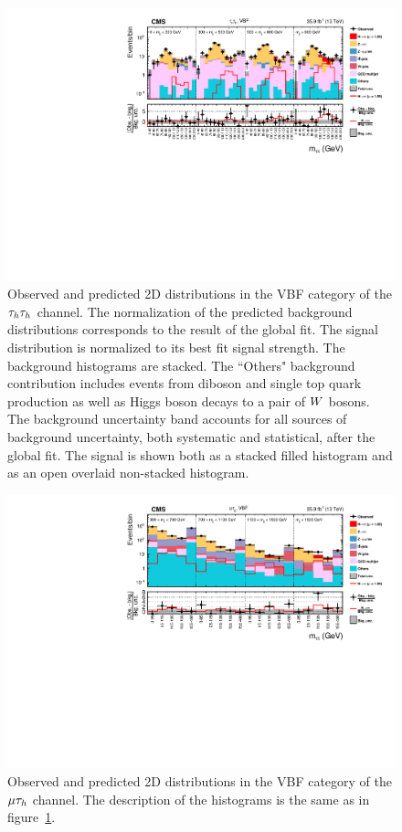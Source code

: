 \begin{figure}[htbp]
\centering
     \includegraphics[width=1.0\textwidth]{higgs_to_taus/plots/Figure_006.pdf}
     \caption{
Observed and predicted 2D distributions in the VBF category of the $\tau_{h}\tau_{h}$ channel.
The normalization of the predicted background distributions corresponds to the result of the global fit.
The signal distribution is normalized to its best fit signal strength. The background histograms are stacked. 
The ``Others" background contribution includes events from diboson and single top quark production as well 
as Higgs boson decays to a pair of $W$ bosons. The background uncertainty band accounts for all sources 
of background uncertainty, both systematic and statistical, after the global fit. 
The signal is shown both as a stacked filled histogram and as an open overlaid non-stacked histogram.
}
     \label{fig:mass_tt_vbf}
\end{figure}

\begin{figure}[htbp]
\centering
     \includegraphics[width=1.0\textwidth]{higgs_to_taus/plots/Figure_007.pdf}
     \caption{Observed and predicted 2D distributions in the VBF category of the $\mu\tau_{h}$ channel. The description of the histograms is the same as in figure~\ref{fig:mass_tt_vbf}.}
     \label{fig:mass_mt_vbf}
\end{figure}

